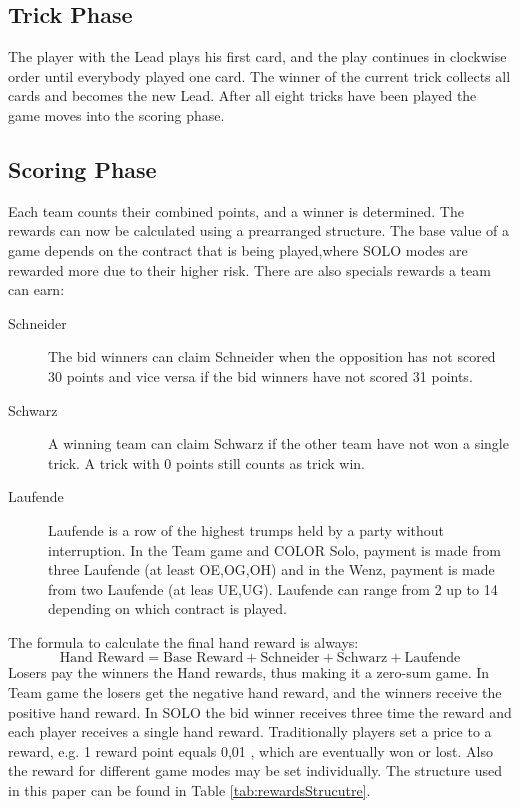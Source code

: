 \subsection{Trick Phase}
The player with the Lead plays his first card, and the play continues in clockwise order until everybody played one
card.
The winner of the current trick collects all cards and becomes the new Lead.
After all eight tricks have been played the game moves into the scoring phase.

\subsection{Scoring Phase}\label{scoringphase}
Each team counts their combined points, and a winner is determined.
The rewards can now be calculated using a prearranged structure.
The base value of a game depends on the contract
that is being played,where SOLO modes are rewarded more due to their higher risk.
\newline
There are also specials rewards a team can earn:
\begin{description}
    \item[Schneider] The bid winners can claim Schneider when the opposition has not scored 30 points and vice versa
    if the bid winners have not scored 31 points.
    \item[Schwarz] A winning team can claim Schwarz if the other team have not won a single trick.
    A trick with 0 points still counts as trick win.
    \item[Laufende] Laufende is a row of the highest trumps held by a party without interruption.
    In the Team game and COLOR Solo, payment is made from three Laufende (at least OE,OG,OH) and in the Wenz,
    payment is made from two Laufende (at leas UE,UG).
    Laufende can range from 2 up to 14 depending on which contract is played.
\end{description}
The formula to calculate the final hand reward is always:
\[\text{Hand Reward} = \text{Base Reward} + \text{Schneider} + \text{Schwarz} + \text{Laufende}\]
Losers pay the winners the Hand rewards, thus making it a zero-sum game.
In Team game the losers get the negative hand reward, and the winners receive the positive hand reward.
In SOLO the bid winner receives three time the reward and each player receives a single hand reward.
Traditionally players set a price to a reward, e.g. 1 reward point equals 0,01 \texteuro, which are eventually won or
lost.
Also the reward for different game modes may be set individually.
The structure used in this paper can be found in Table \ref{tab:rewardsStrucutre}.
